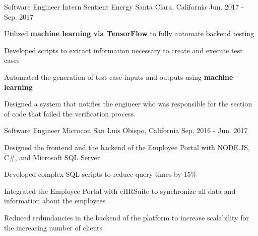 


\begin{cventries}


\cventry
{Software Engineer Intern} %
{Sentient Energy} %
{Santa Clara, California} %
{Jun. 2017 - Sep. 2017} %
{ %
\begin{cvitems}
\item {Utilized \textbf{machine learning via TensorFlow} to fully automate backend testing}
\item {Developed scripts to extract information necessary to create and execute test cases}
\item {Automated the generation of test case inputs and outputs using \textbf{machine learning}}
\item {Designed a system that notifies the engineer who was responsible for the section of code that failed the verification process.}
\end{cvitems}
}


\cventry
{Software Engineer} %
{Microcon} %
{San Luis Obispo, California} %
{Sep. 2016 - Jun. 2017} %
{ %
\begin{cvitems}
\item {Designed the frontend and the backend of the Employee Portal with NODE.JS, C\#, and Microsoft SQL Server}
\item {Developed complex SQL scripts to reduce query times by 15\%}
\item {Integrated the Employee Portal with eHRSuite to synchronize all data and information about the employees}
\item {Reduced redundancies in the backend of the platform to increase scalability for the increasing number of clients}
\end{cvitems}
}


\end{cventries}
